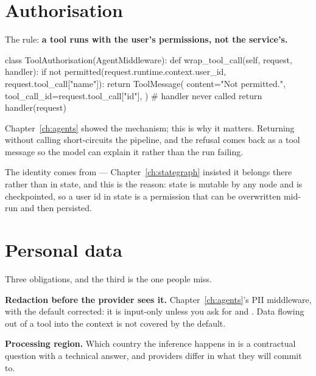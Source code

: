 \section{Authorisation}
\label{sec:authz}

The rule: \textbf{a tool runs with the user's permissions, not the service's.}

\begin{python}[caption={The check, in code the model cannot reach}, label={lst:authz-mw}]
class ToolAuthorisation(AgentMiddleware):
    def wrap_tool_call(self, request, handler):
        if not permitted(request.runtime.context.user_id,
                         request.tool_call["name"]):
            return ToolMessage(
                content="Not permitted.",
                tool_call_id=request.tool_call["id"],
            )                                # handler never called
        return handler(request)
\end{python}

Chapter~\ref{ch:agents} showed the mechanism; this is why it matters. Returning
without calling  short-circuits the pipeline, and the refusal comes
back as a tool message so the model can explain it rather than the run failing.

The identity comes from  --- Chapter~\ref{ch:stategraph}
insisted it belongs there rather than in state, and this is the reason: state is
mutable by any node and is checkpointed, so a user id in state is a permission
that can be overwritten mid-run and then persisted.

\section{Personal data}
\label{sec:pii}

Three obligations, and the third is the one people miss.

\textbf{Redaction before the provider sees it.} Chapter~\ref{ch:agents}'s PII
middleware, with the default corrected: it is input-only unless you ask for
 and . Data flowing out of
a tool into the context is not covered by the default.

\textbf{Processing region.} Which country the inference happens in is a
contractual question with a technical answer, and providers differ in what they
will commit to.


